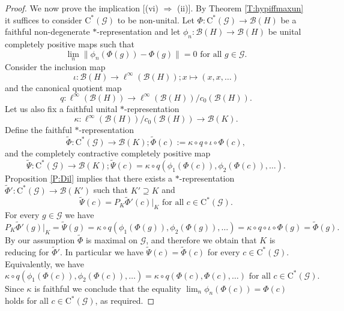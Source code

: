 \documentclass[10pt,a4paper]{amsart}
\newcommand{\B}{{\mathcal{B}}}
\newcommand{\G}{{\mathcal{G}}}
\newcommand{\ca}{\mathrm{C}^*}
\newcommand{\foral}{\text{ for all }}
\def\io{\iota}
\def\ka{\kappa}
\newcommand{\wt}{\widetilde}
\begin{document}
\begin{proof}
We now prove the implication [(vi) $\Rightarrow$ (ii)]. By Theorem \ref{T:hypiffmaxun} it suffices to consider $\ca(\G)$ to be non-unital.
Let $\Phi \colon \ca(\G) \to \B(H)$ be a faithful non-degenerate $*$-representation and let $\phi_n \colon \B(H) \to \B(H)$ be unital completely positive maps such that
\[
\lim_n \|\phi_n(\Phi(g)) - \Phi(g)\| = 0 \foral g \in \G.
\]
Consider the inclusion map
\[
\io \colon \B(H) \to \ell^{\infty}(\B(H)); x \mapsto (x, x, \dots)
\]
and the canonical quotient map
\[
q \colon \ell^{\infty}(\B(H)) \to \ell^\infty(\B(H))/c_0(\B(H)).
\]
Let us also fix a faithful unital $*$-representation
\[
\ka \colon \ell^\infty(\B(H))/c_0(\B(H)) \to \B(K).
\]
Define the faithful $*$-representation
\[
\wt{\Phi} \colon \ca(\G) \to \B(K); \wt{\Phi}(c) := \ka \circ q \circ \io \circ \Phi(c),
\]
and the completely contractive completely positive map
\[
\wt{\Psi} \colon \ca(\G) \to \B(K); \wt{\Psi}(c) = \ka \circ q ( \phi_1(\Phi(c)), \phi_2(\Phi(c)), \dots ).
\]
Proposition \ref{P:Dil} implies that there exists a $*$-representation $\wt{\Phi}'\colon \ca(\G)\to \B(K')$ such that $K'\supseteq K$ and
\[
\wt{\Psi}(c)=P_K \wt{\Phi}'(c)|_K \foral c\in \ca(\G).
\]
For every $g \in \G$ we have
\[
P_K \wt{\Phi}'(g)|_K
=
\wt{\Psi}(g)
=
\ka \circ q ( \phi_1(\Phi(g)), \phi_2(\Phi(g)), \dots )
=
\ka \circ q \circ \io \circ \Phi(g)
=
\wt{\Phi}(g).
\]
By our assumption $\wt{\Phi}$ is maximal on $\G$, and therefore we obtain that $K$ is reducing for $\wt{\Phi}'$.
In particular we have $\wt{\Psi}(c)=\wt{\Phi}(c)$ for every $c\in\ca(\G)$.
Equivalently, we have
\[
\ka \circ q(\phi_1(\Phi(c)), \phi_2(\Phi(c)), \dots)
=
\ka \circ q(\Phi(c), \Phi(c), \dots)
\foral
c \in \ca(\G).
\]
Since $\ka$ is faithful we conclude that the equality $\lim_n \phi_n(\Phi(c)) = \Phi(c)$ holds for all $c \in \ca(\G)$, as required.
\end{proof}
\end{document}
